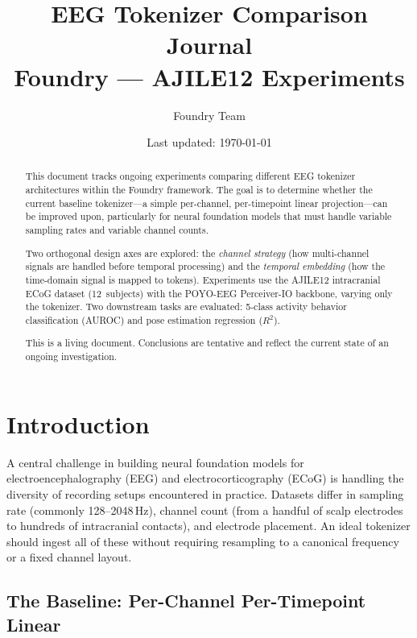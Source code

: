 \documentclass[11pt, a4paper]{article}
\title{EEG Tokenizer Comparison Journal\\[0.3em]
\large Foundry — AJILE12 Experiments}
\author{Foundry Team}
\date{Last updated: \today}
\begin{document}
\maketitle

\begin{abstract}
      This document tracks ongoing experiments comparing different EEG tokenizer
      architectures within the Foundry framework. The goal is to determine
      whether the current baseline tokenizer---a simple per-channel,
      per-timepoint linear projection---can be improved upon, particularly
      for neural foundation models that must handle variable sampling rates
      and variable channel counts.

      Two orthogonal design axes are explored: the \emph{channel strategy}
      (how multi-channel signals are handled before temporal processing) and
      the \emph{temporal embedding} (how the time-domain signal is mapped to
      tokens). Experiments use the AJILE12 intracranial ECoG dataset
      (12~subjects) with the POYO-EEG Perceiver-IO backbone, varying only the
      tokenizer. Two downstream tasks are evaluated: 5-class activity behavior
      classification (AUROC) and pose estimation regression ($R^2$).

      This is a living document. Conclusions are tentative and reflect the
      current state of an ongoing investigation.
\end{abstract}

\tableofcontents
\newpage

\section{Introduction}
\label{sec:introduction}

A central challenge in building neural foundation models for
electroencephalography (EEG) and electrocorticography (ECoG) is handling
the diversity of recording setups encountered in practice. Datasets differ
in sampling rate (commonly 128--2048\,Hz), channel count (from a handful
of scalp electrodes to hundreds of intracranial contacts), and electrode
placement. An ideal tokenizer should ingest all of these without
requiring resampling to a canonical frequency or a fixed channel layout.

\subsection{The Baseline: Per-Channel Per-Timepoint Linear}
\end{document}
